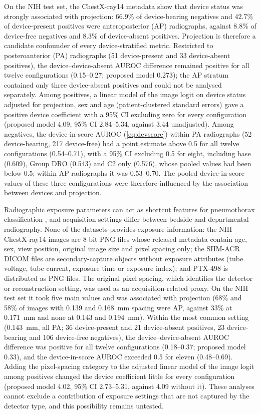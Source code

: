 \documentclass{ieeeaccess}
\begin{document}
On the NIH test set, the ChestX-ray14 metadata show that device status was strongly associated with projection: 66.9\% of device-bearing negatives and 42.7\% of device-present positives were anteroposterior (AP) radiographs, against 8.8\% of device-free negatives and 8.3\% of device-absent positives. Projection is therefore a candidate confounder of every device-stratified metric. Restricted to posteroanterior (PA) radiographs (51 device-present and 33 device-absent positives), the device--device-absent AUROC difference remained positive for all twelve configurations (0.15--0.27; proposed model 0.273); the AP stratum contained only three device-absent positives and could not be analysed separately. Among positives, a linear model of the image logit on device status adjusted for projection, sex and age (patient-clustered standard errors) gave a positive device coefficient with a 95\% CI excluding zero for every configuration (proposed model 4.09, 95\% CI 2.84--5.34, against 3.44 unadjusted). Among negatives, the device-in-score AUROC (\cref{eq:devscore}) within PA radiographs (52 device-bearing, 217 device-free) had a point estimate above 0.5 for all twelve configurations (0.54--0.71), with a 95\% CI excluding 0.5 for eight, including base (0.609), Group DRO (0.543) and C2 only (0.576), whose pooled values had been below 0.5; within AP radiographs it was 0.53--0.70. The pooled device-in-score values of these three configurations were therefore influenced by the association between devices and projection.

Radiographic exposure parameters can act as shortcut features for pneumothorax classification \cite{shu2026exposure}, and acquisition settings differ between bedside and departmental radiography. None of the datasets provides exposure information: the NIH ChestX-ray14 images are 8-bit PNG files whose released metadata contain age, sex, view position, original image size and pixel spacing only; the SIIM-ACR DICOM files are secondary-capture objects without exposure attributes (tube voltage, tube current, exposure time or exposure index); and PTX-498 is distributed as PNG files. The original pixel spacing, which identifies the detector or reconstruction setting, was used as an acquisition-related proxy. On the NIH test set it took five main values and was associated with projection (68\% and 58\% of images with 0.139 and 0.168~mm spacing were AP, against 33\% at 0.171~mm and none at 0.143 and 0.194~mm). Within the most common setting (0.143~mm, all PA; 36 device-present and 21 device-absent positives, 23 device-bearing and 106 device-free negatives), the device--device-absent AUROC difference was positive for all twelve configurations (0.18--0.37; proposed model 0.33), and the device-in-score AUROC exceeded 0.5 for eleven (0.48--0.69). Adding the pixel-spacing category to the adjusted linear model of the image logit among positives changed the device coefficient little for every configuration (proposed model 4.02, 95\% CI 2.73--5.31, against 4.09 without it). These analyses cannot exclude a contribution of exposure settings that are not captured by the detector type, and this possibility remains untested.
\end{document}
